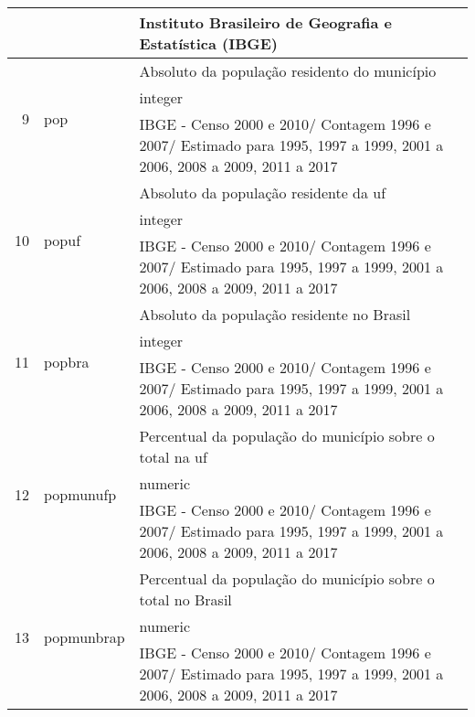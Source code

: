\begin{longtable}{r|l|X}
&&  Instituto Brasileiro de Geografia e Estatística (IBGE)  \\
\hline
\multirow{3}{*}{9} & \multirow{3}{*}{pop} & Absoluto da população residento do município\\*
&&  integer  \\*
&&  IBGE - Censo 2000 e 2010/ Contagem 1996 e 2007/ Estimado para 1995, 1997 a 1999, 2001 a 2006, 2008 a 2009, 2011 a 2017  \\
\hline
\multirow{3}{*}{10} & \multirow{3}{*}{popuf} & Absoluto da população residente da uf\\*
&&  integer  \\*
&&  IBGE - Censo 2000 e 2010/ Contagem 1996 e 2007/ Estimado para 1995, 1997 a 1999, 2001 a 2006, 2008 a 2009, 2011 a 2017  \\
\hline
\multirow{3}{*}{11} & \multirow{3}{*}{popbra} & Absoluto da população residente no Brasil\\*
&&  integer  \\*
&&  IBGE - Censo 2000 e 2010/ Contagem 1996 e 2007/ Estimado para 1995, 1997 a 1999, 2001 a 2006, 2008 a 2009, 2011 a 2017  \\
\hline
\multirow{3}{*}{12} & \multirow{3}{*}{popmunufp} & Percentual da população do município sobre o total na uf\\*
&&  numeric  \\*
&&  IBGE - Censo 2000 e 2010/ Contagem 1996 e 2007/ Estimado para 1995, 1997 a 1999, 2001 a 2006, 2008 a 2009, 2011 a 2017  \\
\hline
\multirow{3}{*}{13} & \multirow{3}{*}{popmunbrap} & Percentual da população do município sobre o total no Brasil\\*
&&  numeric  \\*
&&  IBGE - Censo 2000 e 2010/ Contagem 1996 e 2007/ Estimado para 1995, 1997 a 1999, 2001 a 2006, 2008 a 2009, 2011 a 2017  \\
\hline
\end{longtable}
